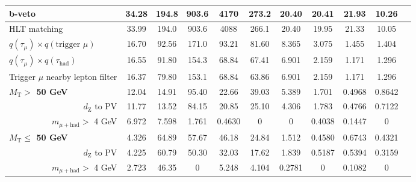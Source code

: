 \begin{table}
\begin{center}
{\begin{tabular}{|m{2.5cm}|c|c|c|c|c|c|c|c|c|c|c|}
  \multicolumn{2}{|l|}{b-veto}                              & 34.28 & 194.8 & 903.6 & 4170   & 273.2 & 20.40  & 20.41  & 21.93  & 10.26 \\
  \hline
  \multicolumn{2}{|l|}{HLT matching}                                   & 33.99 & 194.0 & 903.6 & 4088   & 266.1 & 20.40  & 19.95  & 21.33  & 10.05 \\
  \hline
  \multicolumn{2}{|l|}{$q(\tau_{\mu}) \times q(\text{trigger }\mu)$} & 16.70 & 92.56 & 171.0 & 93.21  & 81.60 & 8.365  & 3.075  & 1.455  & 1.404 \\
  \hline
  \multicolumn{2}{|l|}{$q(\tau_{\mu}) \times q(\tau_{\text{had}})$}     & 16.55 & 91.80 & 154.3 & 68.84  & 67.41 & 6.901  & 2.159  & 1.171  & 1.296 \\
  \hline
  \multicolumn{2}{|l|}{Trigger $\mu$ nearby lepton filter}       & 16.37 & 79.80 & 153.1 & 68.84  & 63.86 & 6.901  & 2.159  & 1.171  & 1.296 \\
  \hline
  \hline
  \multicolumn{2}{|l|}{\textbf{$M_{\text{T}} >$ 50 GeV}}              & 12.04 & 14.91 & 95.40 & 22.66  & 39.03 & 5.389  & 1.701  & 0.4968 & 0.8642 \\
  \hline
  \multicolumn{2}{|r|}{$d_{\text{Z}}$ to PV}                           & 11.77 & 13.52 & 84.15 & 20.85  & 25.10 & 4.306  & 1.783  & 0.4766 & 0.7122 \\
  \hline
  \multicolumn{2}{|r|}{$m_{\mu+\text{had}} >$ 4 GeV} & 6.972 & 7.598 & 1.761 & 0.4630 & 0     & 0      & 0.4038 & 0.1447 & 0 \\
  \hline
  \hline
  \multicolumn{2}{|l|}{\textbf{$M_{\text{T}} \le$ 50 GeV}}            & 4.326 & 64.89 & 57.67 & 46.18  & 24.84 & 1.512  & 0.4580 & 0.6743 & 0.4321 \\
  \hline
  \multicolumn{2}{|r|}{$d_{\text{Z}}$ to PV}                           & 4.225 & 60.79 & 50.30 & 32.03  & 17.62 & 1.839  & 0.5187 & 0.5394 & 0.3159 \\
  \hline
  \multicolumn{2}{|r|}{$m_{\mu+\text{had}} >$ 4 GeV} & 2.723 & 46.35 & 0     & 5.248  & 4.104 & 0.2781 & 0      & 0.1082 & 0 \\
  \hline
\end{tabular}
}
\end{center}
\end{table}

